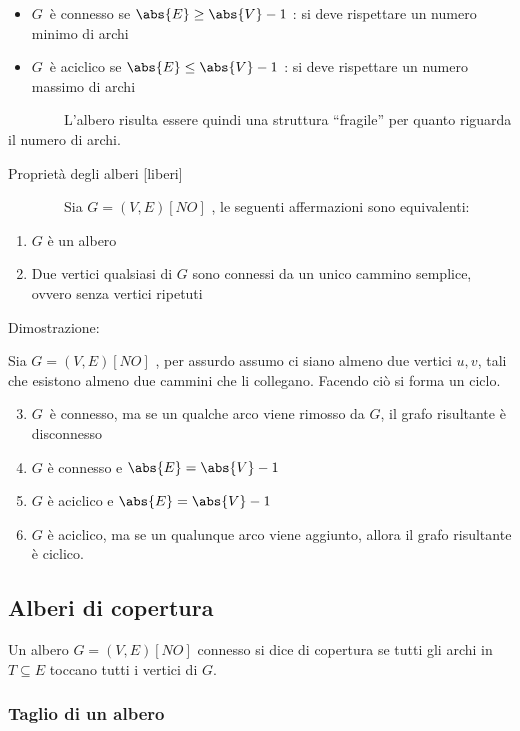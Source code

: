 \documentclass[11pt,a4paper,twoside,openright]{book}
\providecommand{\tightlist}{\setlength{\itemsep}{0pt}\setlength{\parskip}{0pt}}
\begin{document}
{{\begin{itemize}
\tightlist
\item
  $G${~è connesso se $\abs{E} \geq \abs{V} - 1$ : si deve rispettare un numero minimo di archi}
\item
  $G${~è aciclico se $\abs{E} \leq \abs{V} - 1$ : si deve rispettare un numero massimo di archi}
\end{itemize}

{~~~~~~~~L'albero risulta essere quindi una struttura ``fragile'' per
quanto riguarda il numero di archi.}

{Proprietà degli alberi {[}liberi{]}}

{~~~~~~~~Sia }$G=(V,E) [NO]$ {, le seguenti affermazioni sono equivalenti:}

\begin{enumerate}
\tightlist
\item
  {$G$ è un albero}
\item
  {Due vertici qualsiasi di $G$ sono connessi da un unico cammino semplice, ovvero senza vertici ripetuti}
\end{enumerate}

{Dimostrazione:~~~~~~~~}

{Sia }$G=(V,E) [NO]$ {, per assurdo assumo ci siano almeno due vertici $u,v$, tali che esistono almeno due cammini che li collegano. Facendo ciò si forma un ciclo.}

\begin{enumerate}
\setcounter{enumi}{2}
\tightlist
\item
  $G${~è connesso, ma se un qualche
  arco viene rimosso da }$G${, il
  grafo risultante è disconnesso}
\item
  {$G$ è connesso e $\abs{E}=\abs{V}-1$}
\item
  {$G$ è aciclico e $\abs{E}=\abs{V}-1$}
\item
  {$G$ è aciclico, ma se un qualunque arco viene aggiunto, allora il grafo risultante è ciclico.}
\end{enumerate}

\subsection{Alberi di copertura}

{Un albero $G=(V,E) [NO]$ connesso si dice di copertura se tutti gli archi in $T \subseteq E$ toccano tutti i vertici di $G$.}

\subsubsection{Taglio di un albero}

}}
\end{document}
